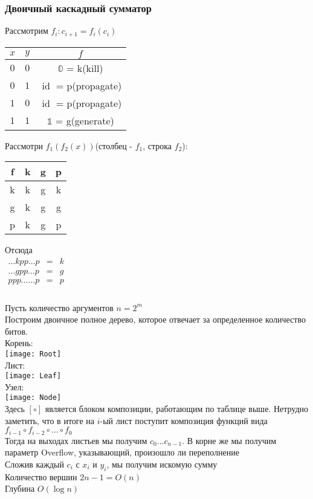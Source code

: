 \documentclass[12pt]{article}
\begin{document}
\subsubsection{Двоичный каскадный сумматор}
Рассмотрим $f_i: c_{i+1} = f_i(c_i)$\\
\begin{center}
    \begin{tabular}{c|c|c}
        $x$ & $y$ & $f$ \\
        \hline
        $0$ & $0$ & $\mathbb{0}$ = k(kill)\\
        $0$ & $1$ & $\operatorname{id}$ = p(propagate)\\
        $1$ & $0$ & $\operatorname{id}$ = p(propagate)\\
        $1$ & $1$ & $\mathbb{1}$ = g(generate)
    \end{tabular}
\end{center}
Рассмотри $f_1(f_2(x))$(столбец - $f_1$, строка $f_2$):
\begin{center}
    \begin{tabular}{c|c c c}
        f & k & g & p \\\hline
        k & k & g & k \\
        g & k & g & g \\
        p & k & g & p
    \end{tabular}
\end{center}
Отсюда \\
$\begin{array}{ccc}
    \ldots k p p \ldots p & = & k\\
    \ldots g p p \ldots p & = & g\\
    p p p \ldots \ldots p & = & p\\
\end{array}$\\\\
Пусть количество аргументов $n=2^m$\\
Построим двоичное полное дерево, которое отвечает за определенное количество битов.\\
Корень:\\
\texttt{[image: Root]}\\
Лист:\\
\texttt{[image: Leaf]}\\
Узел:\\
\texttt{[image: Node]}\\
Здесь $[\circ]$ является блоком композиции, работающим по таблице выше. Нетрудно заметить, что в итоге на $i$-ый лист поступит композиция функций вида $f_{i-1} \circ f_{i-2} \circ \ldots \circ f_0$\\
Тогда на выходах листьев мы получим $c_0\ldots c_{n-1}$. В корне же мы получим параметр Overflow, указывающий, произошло ли переполнение\\
Сложив каждый $c_i$ с $x_i$ и $y_i$, мы получим искомую сумму\\
Количество вершин $2n-1=O(n)$\\
Глубина $O(\log n)$\\
\end{document}
